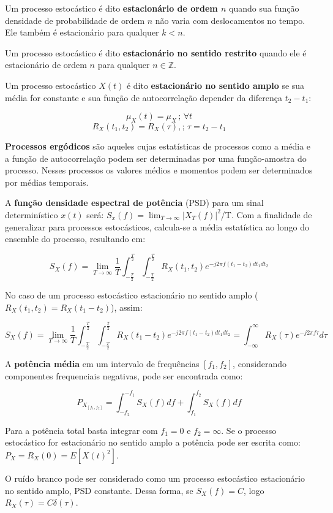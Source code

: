 Um processo estocástico é dito \textbf{estacionário de ordem $n$} quando sua função densidade de probabilidade de ordem $n$ não varia com deslocamentos no tempo. Ele também é estacionário para qualquer $k<n$.

Um processo estocástico é dito \textbf{estacionário no sentido restrito} quando ele é estacionário de ordem $n$ para qualquer $n \in \mathbb{Z}$.

Um processo estocástico $X(t)$ é dito \textbf{estacionário no sentido amplo} se sua média for constante e sua função de autocorrelação depender da diferença $t_2-t_1$:

\begin{equation}\label{alb:1}
\mu_X(t) = \mu_X \, ; \, \forall t
\end{equation}
\begin{equation}\label{alb:2}
R_X(t_1,t_2) = R_X(\tau) , ; \, \tau = t_2-t_1
\end{equation}

\textbf{Processos ergódicos} são aqueles cujas estatísticas de processos como a média e a função de autocorrelação podem ser determinadas por uma função-amostra do processo. Nesses processos os valores médios e momentos podem ser determinados por médias temporais.

A \textbf{função densidade espectral de potência} (PSD) para um sinal determinístico $x(t)$ será: $S_x(f) = \lim_{T\to\infty} |X_T(f)|^2$/T. Com a finalidade de generalizar para processos estocásticos, calcula-se a média estatística ao longo do ensemble do processo, resultando em:

\begin{equation}\label{alb:3}
S_X(f) = \lim_{T\to\infty} \frac{1}{T} \int_{-\frac{T}{2}}^{\frac{T}{2}} \int_{-\frac{T}{2}}^{\frac{T}{2}} R_X(t_1,t_2)e^{-j2\pi f(t_1-t_2)dt_1dt_2}
\end{equation}

No caso de um processo estocástico estacionário no sentido amplo ($R_X(t_1,t_2) = R_X(t_1-t_2)$), assim:

\begin{equation}\label{alb:4}
S_X(f) = \lim_{T\to\infty} \frac{1}{T} \int_{-\frac{T}{2}}^{\frac{T}{2}} \int_{-\frac{T}{2}}^{\frac{T}{2}} R_X(t_1-t_2)e^{-j2\pi f(t_1-t_2)dt_1dt_2} = \int_{-\infty}^{\infty} R_X(\tau) e^{-j2\pi f \tau}d\tau
\end{equation}

A \textbf{potência média} em um intervalo de frequências $[f_1,f_2]$, considerando componentes frequenciais negativas, pode ser encontrada como:

\begin{equation}\label{alb:5}
P_{X_{[f_1,f_2]}} = \int_{-f_2}^{-f_1} S_X(f)df + \int_{f_1}^{f_2} S_X(f)df
\end{equation}

Para a potência total basta integrar com $f_1=0$ e $f_2=\infty$. Se o processo estocástico for estacionário no sentido amplo a potência pode ser escrita como: $P_X = R_X(0) = E[X(t)^2]$.

O ruído branco pode ser considerado como um processo estocástico estacionário no sentido amplo, PSD constante. Dessa forma, se $S_X(f) = C$, logo $R_X(\tau) = C \delta (\tau)$.



